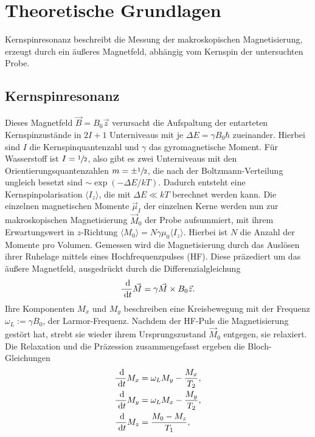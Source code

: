 \newpage					%



\section{Theoretische Grundlagen}
Kernspinresonanz beschreibt die Messung der makroskopischen Magnetisierung, erzeugt durch ein äußeres Magnetfeld, abhängig vom Kernspin der
untersuchten Probe.
\subsection{Kernspinresonanz}
Dieses Magnetfeld $\vec B=B_0\vec z$ verursacht die Aufspaltung der entarteten Kernspinzustände in $2I+1$ Unterniveaus mit je 
$\Delta E = \gamma B_0 \hbar$ zueinander. Hierbei sind $I$ die Kernspinquantenzahl und $\gamma$ das gyromagnetische Moment. Für Wasserstoff ist
$I=\sfrac12$, also gibt es zwei Unterniveaus mit den Orientierungsquantenzahlen $m=\pm\sfrac12$, die nach der Boltzmann-Verteilung ungleich besetzt 
sind $\sim\exp\left(-\Delta E/kT\right)$.
Dadurch entsteht eine Kernspinpolarisation $\langle I_z \rangle$, die mit $\Delta E \ll kT$ berechnet werden kann. 
Die einzelnen magnetischen Momente $\vec \mu_I$ der einzelnen Kerne werden nun zur makroskopischen Magnetisierung $\vec M_0$ der Probe aufsummiert,
mit ihrem Erwartungswert in $z$-Richtung $\langle M_0\rangle = N \gamma \mu_0 \langle I_z\rangle$. Hierbei ist $N$ die Anzahl der Momente pro Volumen.
Gemessen wird die Magnetisierung durch das Auslösen ihrer Ruhelage mittels eines Hochfrequenzpulses (HF). Diese präzediert um das äußere Magnetfeld,
ausgedrückt durch die Differenzialgleichung
\begin{align}
 \frac{\; \mathrm{d}}{\; \mathrm{d} t}\vec M = \gamma \vec M \times B_0 \vec z.
 \label{eq:Mdgl}
\end{align}
Ihre Komponenten $M_x$ und $M_y$ beschreiben eine Kreisbewegung mit der Frequenz $\omega_L := \gamma B_0$, der Larmor-Frequenz. Nachdem
der HF-Puls die Magnetisierung gestört hat, strebt sie wieder ihrem Ursprungszustand $\vec M_0$ entgegen, sie relaxiert. Die Relaxation
und die Präzession zusammengefasst ergeben die Bloch-Gleichungen
\begin{align}
 \frac{\; \mathrm{d}}{\; \mathrm{d} t}M_x &= \omega_L M_y - \frac{M_x}{T_2},\\
 \frac{\; \mathrm{d}}{\; \mathrm{d} t}M_y &= \omega_L M_x - \frac{M_y}{T_2},\\
 \frac{\; \mathrm{d}}{\; \mathrm{d} t}M_z &= \frac{M_0-M_z}{T_1},
\end{align}
